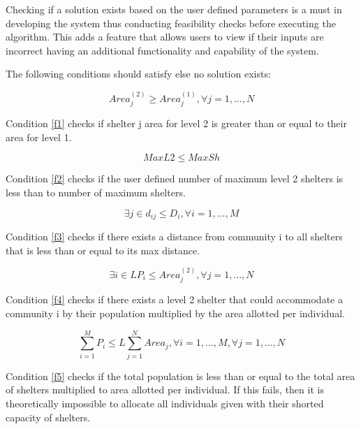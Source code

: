 \documentclass[11pt,letterpaper,]{article}
\begin{document}
	Checking if a solution exists based on the user defined parameters is a must in developing the system thus conducting feasibility checks before executing the algorithm. This adds a feature that allows users to view if their inputs are incorrect having an additional functionality and capability of the system.
	
	The following conditions should satisfy else no solution exists:
	
	\begin{equation} 
		\label{f1}
		Area_{j}^{(2)} \ge Area_{j}^{(1)}, \forall j = 1, ..., N
	\end{equation}
	
	Condition \ref{f1} checks if shelter j area for level 2 is greater than or equal to their area for level 1. 
	
	\begin{equation} 
		\label{f2}
		MaxL2 \le MaxSh
	\end{equation}
	
	Condition \ref{f2} checks if the user defined number of maximum level 2 shelters is less than to number of maximum shelters.
	
	\begin{equation} 
		\label{f3}
		\exists j \in d_{ij} \le D_{i}, \forall i = 1, ..., M
	\end{equation}
	
	Condition \ref{f3} checks if there exists a distance from community i to all shelters that is less than or equal to its max distance.
	
	\begin{equation} 
		\label{f4}
		\exists i \in LP_{i} \le Area_{j}^{(2)}, \forall j = 1, ..., N
	\end{equation}
	
	Condition \ref{f4} checks if there exists a level 2 shelter that could accommodate a community i by their population multiplied by the area allotted per individual. 
	
	\begin{equation} 
		\label{f5}
		\sum_{i=1}^{M}P_{i} \le L\sum_{j=1}^{N}Area_{j}, \forall i=1,...,M,  \forall j=1,...,N
	\end{equation}
	
	Condition \ref{f5} checks if the total population is less than or equal to the total area of shelters multiplied to area allotted per individual. If this fails, then it is theoretically impossible to allocate all individuals given with their shorted capacity of shelters.
	
\end{document}
